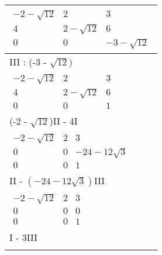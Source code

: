 \begin{longtable}{p{10cm}}
    $\displaystyle\begin{matrix}
                          -2 - \sqrt{12} & 2             & 3              \\
                          4              & 2 - \sqrt{12} & 6              \\
                          0              & 0             & -3 - \sqrt{12}
                      \end{matrix}$                          \\\hline
    III : (-3 - $\sqrt{12}$)                                                               \\\hline\pagebreak[0]
    $\displaystyle\begin{matrix}
                          -2 - \sqrt{12} & 2             & 3 \\
                          4              & 2 - \sqrt{12} & 6 \\
                          0              & 0             & 1
                      \end{matrix}$                                       \\\hline
    (-2 - $\sqrt{12}$)II - 4I                                                              \\\hline\pagebreak[0]
    $\displaystyle\begin{matrix}
                          -2 - \sqrt{12} & 2 & 3                \\
                          0              & 0 & -24 - 12\sqrt{3} \\
                          0              & 0 & 1
                      \end{matrix}$                                    \\\hline
    II - $(-24 - 12\sqrt{3})$III                                                           \\\hline\pagebreak[0]
    $\displaystyle\begin{matrix}
                          -2 - \sqrt{12} & 2 & 3 \\
                          0              & 0 & 0 \\
                          0              & 0 & 1
                      \end{matrix}$                                                   \\\hline
    I - 3III                                                                               \\\hline\pagebreak[0]

\end{longtable}
